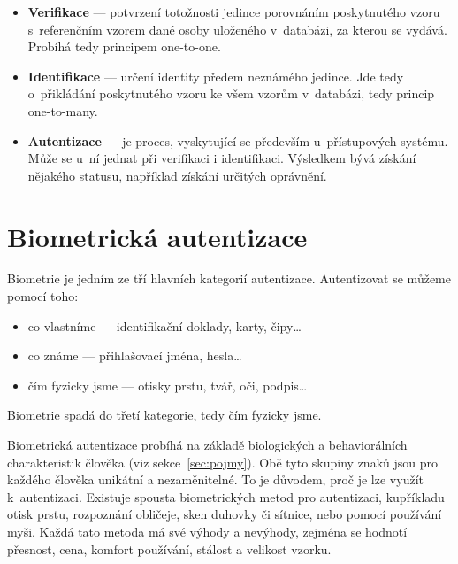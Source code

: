 \begin{itemize}
  \item \textbf{Verifikace} --- potvrzení totožnosti jedince porovnáním poskytnutého vzoru s~referenčním vzorem dané osoby uloženého v~databázi, %
  za kterou se vydává. Probíhá tedy principem one-to-one.                                                                                     %
  \item \textbf{Identifikace} --- určení identity předem neznámého jedince.                                                                       %
  Jde tedy o~přikládání poskytnutého vzoru ke všem vzorům v~databázi, tedy princip one-to-many.                                                %
  \item \textbf{Autentizace} --- je proces, vyskytující se především u~přístupových systému.                                                      %
  Může se u~ní jednat při verifikaci i identifikaci.                                                                                            %
  Výsledkem bývá získání nějakého statusu, například získání určitých oprávnění.~\cite{Scurek2015}                                                        %
\end{itemize}

\section{Biometrická autentizace}
Biometrie je jedním ze tří hlavních kategorií autentizace.
Autentizovat se můžeme pomocí toho:

\begin{itemize}
  \item co vlastníme --- identifikační doklady, karty, čipy\ldots   %
  \item co známe --- přihlašovací jména, hesla\ldots                %
  \item čím fyzicky jsme --- otisky prstu, tvář, oči, podpis\ldots~\cite{RakRoman2008}%
\end{itemize}                                                   %
Biometrie spadá do třetí kategorie, tedy čím fyzicky jsme. 
\newline

Biometrická autentizace probíhá na základě biologických a behaviorálních charakteristik člověka (viz sekce~\ref{sec:pojmy}). 
Obě tyto skupiny znaků jsou pro každého člověka unikátní a nezaměnitelné. To je důvodem, proč je lze využít k~autentizaci.
Existuje spousta biometrických metod pro autentizaci, kupříkladu otisk prstu, rozpoznání obličeje, sken duhovky či sítnice, nebo pomocí používání myši. 
Každá tato metoda má své výhody a nevýhody, zejména se hodnotí přesnost, cena, komfort používání, stálost a velikost vzorku.

